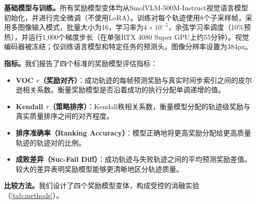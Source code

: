 \textbf{基础模型与训练。}所有奖励模型变体均从SmolVLM-500M-Instruct视觉语言模型初始化，并进行完全微调（不使用LoRA）。训练对每个轨迹使用8个子采样帧，采用多图像输入模式，批量大小为16，学习率为$4 \times 10^{-5}$，余弦学习率调度（10\%预热），并运行1,000个梯度步长（在单张RTX 4080 Super GPU上约55分钟）。视觉编码器被冻结；仅训练语言模型和特定任务的预测头。图像分辨率设置为384px。

\textbf{指标。}我们报告了四个标准的奖励模型评估指标：
\begin{itemize}[leftmargin=*,noitemsep]
    \item \textbf{VOC $r$（奖励对齐）}：成功轨迹的每帧预测奖励与真实时间步索引之间的皮尔逊相关系数。衡量奖励模型是否沿着成功的执行分配单调递增的值。
    \item \textbf{Kendall $\tau$（策略排序）}：Kendall秩相关系数，衡量模型分配的轨迹级奖励与真实质量排序之间的对齐程度。
    \item \textbf{排序准确率（Ranking Accuracy）}：模型正确地将更高奖励分配给更高质量轨迹的轨迹对的比例。
    \item \textbf{成败差异（Suc-Fail Diff）}：成功轨迹与失败轨迹之间的平均预测奖励差值。较大的差异表明奖励模型能够更清晰地区分轨迹质量。
\end{itemize}

\textbf{比较方法。}我们设计了四个奖励模型变体，构成受控的消融实验（\cref{tab:methods}）。

\begin{table}[ht]
    \centering
    \caption{四种比较方法的配置。前三种仅使用成对偏好标签，监督预言机额外使用帧级进度标签。}
    \label{tab:methods}
\end{table}

